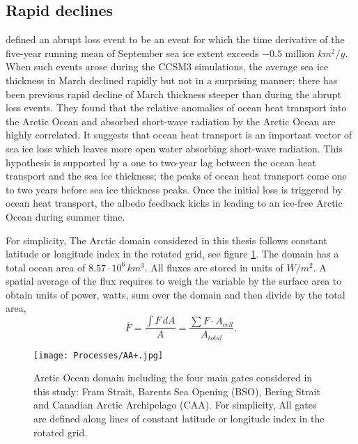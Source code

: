 
\subsection{Rapid declines}\label{intro}

\cite{ISI:000242942100008}  defined an abrupt loss event to be an event for which the time derivative of the five-year running mean of September sea ice extent exceeds $-0.5$ million $km^2/y$. When such events arose during the CCSM3 simulations, the average sea ice thickness in March declined rapidly but not in a surprising manner; there has been previous rapid decline of March thickness steeper than during the abrupt loss events. They found that the relative anomalies of ocean heat transport into the Arctic Ocean and absorbed short-wave radiation by the Arctic Ocean are highly correlated. It suggests that ocean heat transport is an important vector of sea ice loss which leaves more open water absorbing short-wave radiation. This hypothesis is supported by a one to two-year lag between the ocean heat transport and the sea ice thickness; the peaks of ocean heat transport come one to two years before sea ice thickness peaks. Once the initial loss is triggered by ocean heat transport, the albedo feedback kicks in leading to an ice-free Arctic Ocean during summer time.

For simplicity, The Arctic domain considered in this thesis follows constant latitude or longitude index in the rotated grid, see figure \ref{AA}. The domain has a total ocean area of $8.57 \cdot 10^6 \, km^3$. All fluxes are stored in units of $W/m^2$. A spatial average of the flux requires to weigh the variable by the surface area to obtain units of power, watts, sum over the domain and then divide by the total area,
\begin{equation}
\overline{F} = \frac{\int F\, dA}{A} = \frac{\sum F\cdot A_{cell}}{A_{total}}.
\end{equation}

\begin{figure}
\center
\texttt{[image: Processes/AA+.jpg]}
\caption{Arctic Ocean domain including the four main gates considered in this study: Fram Strait, Barents Sea Opening (BSO), Bering Strait and Canadian Arctic Archipelago (CAA).  For simplicity, All gates are defined along lines of constant latitude or longitude index in the rotated grid.}
\label{AA}
\end{figure}



